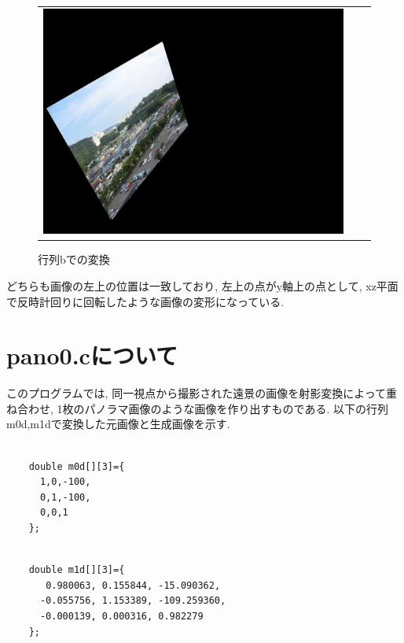 \documentclass[a4j]{jarticle}
\begin{document}
\begin{figure}[htbp]
\begin{tabular}{ccc}
\begin{minipage}{0.3\hsize}
\includegraphics[bb=0 0 1024 768,scale=.13]{outb.jpg}
\caption{行列bでの変換}
\end{minipage}
\end{tabular}
\end{figure}

どちらも画像の左上の位置は一致しており, 左上の点がy軸上の点として, xz平面で反時計回りに回転したような画像の変形になっている. 

\newpage
\section{pano0.cについて}
このプログラムでは, 同一視点から撮影された遠景の画像を射影変換によって重ね合わせ, 1枚のパノラマ画像のような画像を作り出すものである. 以下の行列m0d,m1dで変換した元画像と生成画像を示す. 

\begin{minipage}{0.5\hsize}
\begin{verbatim}

    double m0d[][3]={
      1,0,-100,
      0,1,-100,
      0,0,1
    };
\end{verbatim}
\end{minipage}
\begin{minipage}{0.5\hsize}
\begin{verbatim}

    double m1d[][3]={
       0.980063, 0.155844, -15.090362,
      -0.055756, 1.153389, -109.259360,
      -0.000139, 0.000316, 0.982279
    };
\end{verbatim}
\end{minipage}
\end{document}
